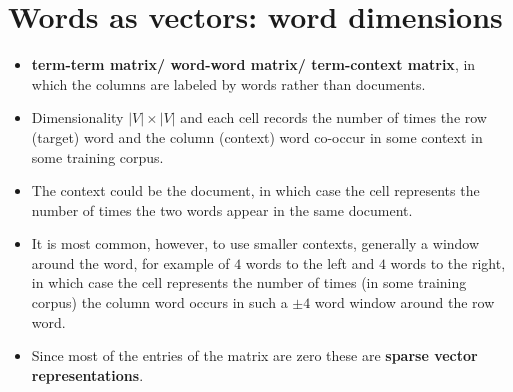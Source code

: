 \section{Words as vectors: word dimensions \cite{nlp-1}} \label{tf-idf: Words as vectors: word dimensions}

\begin{itemize}
    \item \textbf{term-term matrix/ word-word matrix/ term-context matrix}\label{term-term matrix/ word-word matrix/ term-context matrix}, in which the columns are labeled by words rather than documents. 
    
    \item Dimensionality $|V|\times|V|$ and each cell records the number of times the row (target) word and the column (context) word co-occur in some context in some training corpus.

    \item The context could be the document, in which case the cell represents the number of times the two words appear in the same document.

    \item It is most common, however, to use smaller contexts, generally a window around the word, for example of $4$ words to the left and $4$ words to the right, in which case the cell represents the number of times (in some training corpus) the column word occurs in such a $\pm 4$ word window around the row word.

    \item Since most of the entries of the matrix are zero these are \textbf{sparse vector representations}.
\end{itemize}


